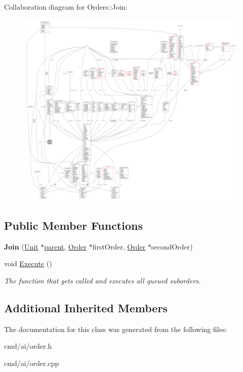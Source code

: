 Collaboration diagram for Orders\+:\+:Join\+:
\nopagebreak
\begin{figure}[H]
\begin{center}
\leavevmode
\includegraphics[width=350pt]{d3/ddb/classOrders_1_1Join__coll__graph}
\end{center}
\end{figure}
\subsection*{Public Member Functions}
\begin{DoxyCompactItemize}
\item 
{\bfseries Join} (\hyperlink{classUnit}{Unit} $\ast$\hyperlink{classOrder_a57548b2476945f89ac22fafa4cb5863b}{parent}, \hyperlink{classOrder}{Order} $\ast$first\+Order, \hyperlink{classOrder}{Order} $\ast$second\+Order)\hypertarget{classOrders_1_1Join_ac2ec9cc9014ffc675098a61692166e8e}{}\label{classOrders_1_1Join_ac2ec9cc9014ffc675098a61692166e8e}

\item 
void \hyperlink{classOrders_1_1Join_a0fc44f29523d32e987e7fe4fa6523a8d}{Execute} ()\hypertarget{classOrders_1_1Join_a0fc44f29523d32e987e7fe4fa6523a8d}{}\label{classOrders_1_1Join_a0fc44f29523d32e987e7fe4fa6523a8d}

\begin{DoxyCompactList}\small\item\em The function that gets called and executes all queued suborders. \end{DoxyCompactList}\end{DoxyCompactItemize}
\subsection*{Additional Inherited Members}


The documentation for this class was generated from the following files\+:\begin{DoxyCompactItemize}
\item 
cmd/ai/order.\+h\item 
cmd/ai/order.\+cpp\end{DoxyCompactItemize}
